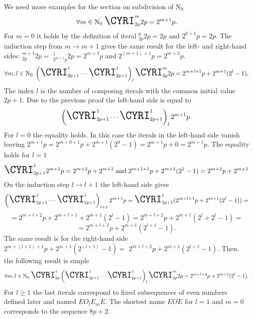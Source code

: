 \documentclass{article}
\begin{document}
We need more examples for the section on subdivision of $\mathrm{N_0}$
\begin{displaymath}
\forall m \in \mathrm{N_0} \; \textrm{\LARGE{\CYRI}}_{2p}^{m}2p = 2^{m+1}p.
\end{displaymath}
For $m = 0$ it holds by the definition of iteral \CYRI$_{2p}^{0}2p = 2p$ and $2^{0+1}p = 2p$. The induction step from $m \to m + 1$ gives the same result for the left- and right-hand sides: \CYRI$_{2p}^{m+1}2p = $ \CYRI$_{2^{m + 1}p}^{1}2p =2^{m+2}p$ and $2^{(m+1)+1}p = 2^{m+2}p$.
\begin{displaymath}
\forall m, l \in \mathrm{N_0} \; \left(\textrm{\LARGE{\CYRI}}_{2p+1}^{1}\cdots
\textrm{\LARGE{\CYRI}}_{2p+1}^{1}\right)_{l}
\textrm{\LARGE{\CYRI}}_{2p}^{m}2p = 2^{m + l + 1}p + 2^{m+1}(2^l -1),
\end{displaymath}
The index $l$ is the number of composing iterals with the common initial value $2p + 1$. Due to the previous proof the left-hand side is equal to
\begin{displaymath}
\left(\textrm{\LARGE{\CYRI}}_{2p+1}^{1}\cdots
\textrm{\LARGE{\CYRI}}_{2p+1}^{1}\right)_{l}
2^{m + 1}p.
\end{displaymath}
For $l = 0$ the equality holds. In this case the iterals in the left-hand side vanish leaving $2^{m + 1}p = 2^{m + 0 + 1}p + 2^{m+1}(2^0 -1) = 2^{m + 1}p + 0 = 2^{m + 1}p$. The equality holds for $l = 1$ 
\begin{displaymath}
\textrm{\LARGE{\CYRI}}_{2p+1}^{1}2^{m + 1}p = 2^{m + 2}p + 2^{m + 1} \; \textrm{and} \;
2^{m + 1 + 1}p + 2^{m+1}(2^1 -1) = 2^{m + 2}p + 2^{m + 1}
\end{displaymath}
On the induction step $l \to l + 1$ the left-hand side gives
\begin{displaymath}
\left(\textrm{\LARGE{\CYRI}}_{2p+1}^{1}\cdots
\textrm{\LARGE{\CYRI}}_{2p+1}^{1}\right)_{l+1}
2^{m + 1}p = \textrm{\LARGE{\CYRI}}_{2p+1}^{1}(2^{m + l + 1}p + 2^{m+1}(2^l -1)) =
\end{displaymath}
\begin{displaymath}
= 2^{m + l + 2}p + 2^{m + l + 1} + 2^{m+1}(2^l -1) = 2^{m + l + 2}p + 2^{m+1}(2^l + 2^l -1) =
\end{displaymath}
\begin{displaymath}
= 2^{m + l + 2}p + 2^{m+1}(2^{l+1} -1).
\end{displaymath}
The same result is for the right-hand side $2^{m + (l + 1) + 1}p + 2^{m+1}(2^{(l+1)} -1) = $
$2^{m + l + 2}p + 2^{m+1}(2^{l+1} -1)$. Then, the following result is simple
\begin{displaymath}
\forall m, l \in \mathrm{N_0} \; \textrm{\LARGE{\CYRI}}_{2p}^{1}\left(\textrm{\LARGE{\CYRI}}_{2p+1}^{1}\cdots
\textrm{\LARGE{\CYRI}}_{2p+1}^{1}\right)_{l}
\textrm{\LARGE{\CYRI}}_{2p}^{m}2p = 2^{m + l + 2}p + 2^{m+1}(2^l -1),
\end{displaymath}
For $l \geq 1$ the last iterals correspond to fixed subsequences of even numbers defined later and named $EO_l{E}_m{E}$. The shortest name $EOE$ for $l = 1$ and $m = 0$ corresponds to the sequence $8p + 2$.
\end{document}
